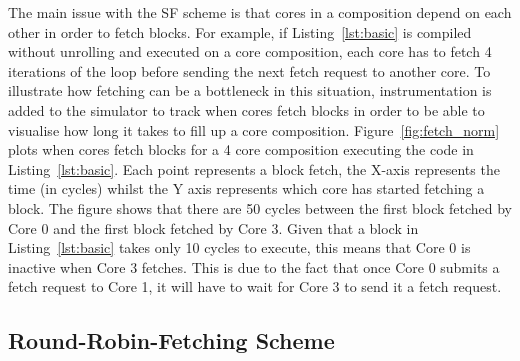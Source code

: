 The main issue with the SF scheme is that cores in a composition depend on each other in order to fetch blocks.
For example, if Listing~\ref{lst:basic} is compiled without unrolling and executed on a core composition, each core has to fetch 4 iterations of the loop before sending the next fetch request to another core.
To illustrate how fetching can be a bottleneck in this situation, instrumentation is added to the simulator to track when cores fetch blocks in order to be able to visualise how long it takes to fill up a core composition.
Figure~\ref{fig:fetch_norm} plots when cores fetch blocks for a 4 core composition executing the code in Listing~\ref{lst:basic}.
Each point represents a block fetch, the X-axis represents the time (in cycles) whilst the Y axis represents which core has started fetching a block.
The figure shows that there are 50 cycles between the first block fetched by Core 0 and the first block fetched by Core 3.
Given that a block in Listing~\ref{lst:basic} takes only 10 cycles to execute, this means that Core 0 is inactive when Core 3 fetches.
This is due to the fact that once Core 0 submits a fetch request to Core 1, it will have to wait for Core 3 to send it a fetch request.


\subsection{Round-Robin-Fetching Scheme}


